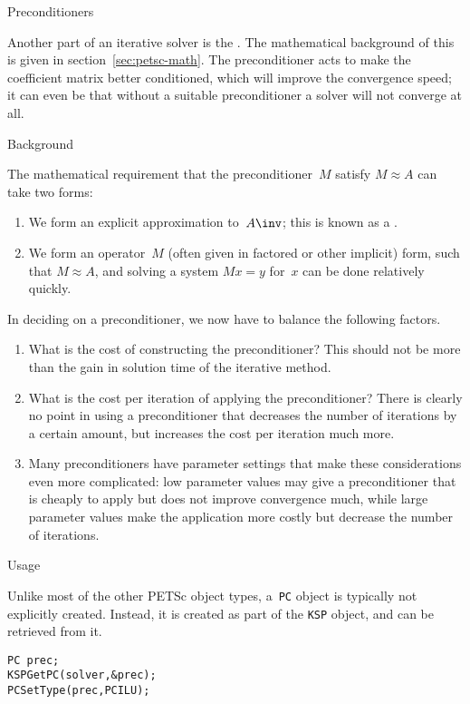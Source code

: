  {Preconditioners}

Another part of an iterative solver is the .
The mathematical background of this
is given in section~\ref{sec:petsc-math}.
The preconditioner acts to make the coefficient matrix better conditioned,
which will improve the convergence speed; it can even be that without
a suitable preconditioner a solver will not converge at all.

 {Background}

The mathematical requirement that the preconditioner~$M$
satisfy $M\approx A$ can take two forms:
\begin{enumerate}
\item We form an explicit approximation to~$A\inv$; this is known as a
  .
\item We form an operator~$M$ (often given in factored or other
  implicit) form, such that $M\approx A$, and solving a system $Mx=y$
  for~$x$ can be done relatively quickly.
\end{enumerate}

In deciding on a preconditioner, we now have to balance the following factors.
\begin{enumerate}
\item What is the cost of constructing the preconditioner? This should
  not be more than the gain in solution time of the iterative method.
\item What is the cost per iteration of applying the preconditioner?
  There is clearly no point in using a preconditioner that decreases
  the number of iterations by a certain amount, but increases the cost
  per iteration much more.
\item Many preconditioners have parameter settings that make these
  considerations even more complicated: low parameter values may give
  a preconditioner that is cheaply to apply but does not improve
  convergence much, while large parameter values make the application
  more costly but decrease the number of iterations.
\end{enumerate}

 {Usage}

Unlike most of the other PETSc object types, a~\lstinline{PC} object
is typically not explicitly created. Instead, it is created as part of
the \lstinline{KSP} object, and can be retrieved from it.

\begin{lstlisting}
PC prec;
KSPGetPC(solver,&prec);
PCSetType(prec,PCILU);
\end{lstlisting}

